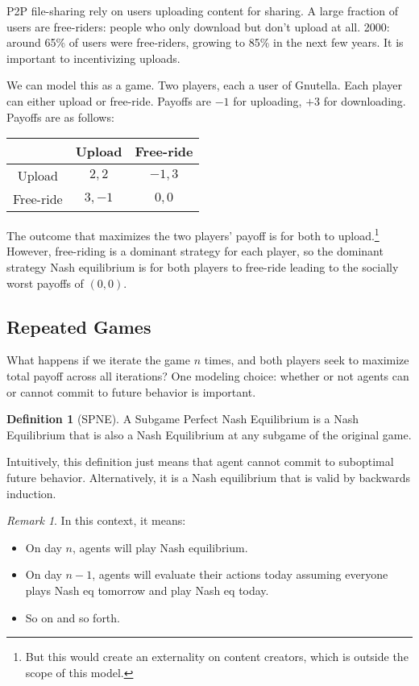\documentclass[dvipsnames]{article}
\theoremstyle{definition}
\newtheorem{definition}{Definition}[section]
\theoremstyle{remark}
\newtheorem*{remark}{Remark}
\begin{document}
P2P file-sharing rely on users uploading content for sharing. A large fraction of users are free-riders: people who only download but don't upload at all. 2000: around 65\% of users were free-riders, growing to 85\% in the next few years. It is important to incentivizing uploads. 

We can model this as a game. Two players, each a user of Gnutella. Each player can either upload or free-ride. Payoffs are $-1$ for uploading, $+3$ for downloading. Payoffs are as follows: 

\begin{table}[h]\centering
	\begin{tabular}{c|c|c|}
		& Upload & Free-ride\\ \hline
		Upload & $2,2$ & $-1,3$  \\ \hline
		Free-ride & $3,-1$ & $0,0$ \\ \hline
	\end{tabular}
\end{table}

The outcome that maximizes the two players' payoff is for both to upload.\footnote{But this would create an externality on content creators, which is outside the scope of this model.} However, free-riding is a dominant strategy for each player, so the dominant strategy Nash equilibrium is for both players to free-ride leading to the socially worst payoffs of $(0,0)$.

\subsection{Repeated Games}

What happens if we iterate the game $n$ times, and both players seek to maximize total payoff across all iterations? One modeling choice: whether or not agents can or cannot commit to future behavior is important. 

\begin{definition}[SPNE]
	A Subgame Perfect Nash Equilibrium is a Nash Equilibrium that is also a Nash Equilibrium at any subgame of the original game. 
\end{definition}

Intuitively, this definition just means that agent cannot commit to suboptimal future behavior. Alternatively, it is a Nash equilibrium that is valid by backwards induction.

\begin{remark}
	In this context, it means:
	\begin{itemize}
		\item On day $n$, agents will play Nash equilibrium.
		\item On day $n-1$, agents will evaluate their actions today assuming everyone plays Nash eq tomorrow and play Nash eq today.
		\item So on and so forth. 
	\end{itemize}
\end{remark}
\end{document}
